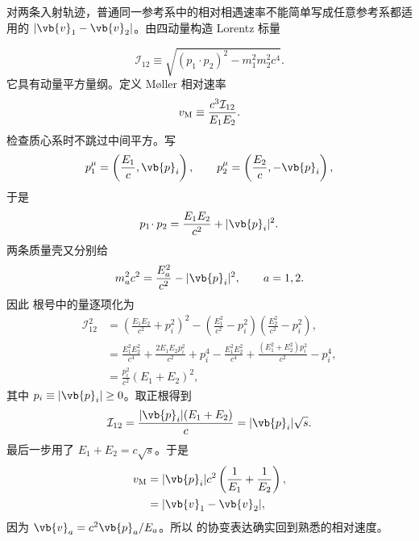 \begin{derivation}[不变入射通量与相遇速率]
对两条入射轨迹，普通同一参考系中的相对相遇速率不能简单写成任意参考系都适用的 $|\vb{v}_1-\vb{v}_2|$。由四动量构造 Lorentz 标量

\begin{equation*}
 \mathcal I_{12}
 \equiv\sqrt{(p_1\!\cdot p_2)^2-m_1^2m_2^2c^4}.
 \end{equation*}
它具有动量平方量纲。定义 M\o ller 相对速率
\begin{equation*}
 v_{\rm M}
 \equiv
 \frac{c^3\mathcal I_{12}}{E_1E_2}.
 \end{equation*}
检查质心系时不跳过中间平方。写
\begin{equation*}
 p_1^\mu=\left(\frac{E_1}{c},\vb{p}_i\right),
 \qquad
 p_2^\mu=\left(\frac{E_2}{c},-\vb{p}_i\right),
\end{equation*}
于是
\begin{equation*}
 p_1\!\cdot p_2=\frac{E_1E_2}{c^2}+|\vb{p}_i|^2.
\end{equation*}
两条质量壳又分别给
\begin{equation*}
 m_a^2c^2=\frac{E_a^2}{c^2}-|\vb{p}_i|^2,
 \qquad a=1,2.
\end{equation*}
因此  根号中的量逐项化为
\begin{align*}
 \mathcal I_{12}^2
 &=\left(\frac{E_1E_2}{c^2}+p_i^2\right)^2
 -\left(\frac{E_1^2}{c^2}-p_i^2\right)
  \left(\frac{E_2^2}{c^2}-p_i^2\right),\\
 &=\frac{E_1^2E_2^2}{c^4}
 +\frac{2E_1E_2p_i^2}{c^2}+p_i^4
 -\frac{E_1^2E_2^2}{c^4}
 +\frac{(E_1^2+E_2^2)p_i^2}{c^2}-p_i^4,\\
 &=\frac{p_i^2}{c^2}(E_1+E_2)^2,
\end{align*}
其中 $p_i\equiv|\vb{p}_i|\ge0$。取正根得到
\begin{equation*}
 {
 \mathcal I_{12}
 =\frac{|\vb{p}_i|(E_1+E_2)}{c}
 =|\vb{p}_i|\sqrt s.}
 \end{equation*}
最后一步用了 $E_1+E_2=c\sqrt s$。于是
\begin{align*}
 v_{\rm M}
 &=|\vb{p}_i|c^2
 \left(\frac1{E_1}+\frac1{E_2}\right),\\
 &=|\vb{v}_1-\vb{v}_2|,
\end{align*}
因为 $\vb{v}_a=c^2\vb{p}_a/E_a$。所以  的协变表达确实回到熟悉的相对速度。
\end{derivation}

